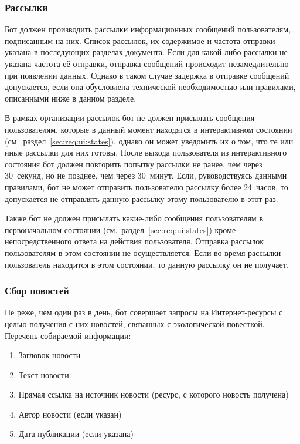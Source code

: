     \subsubsection{Рассылки}
        \label{sec:req:fn:newsletter}
        Бот должен производить рассылки информационных сообщений
        пользователям, подписанным на них. Список рассылок,
        их содержимое и частота отправки указана в последующих разделах документа.
        Если для какой-либо рассылки не указана частота её отправки, отправка сообщений происходит
        незамедлительно при появлении данных. Однако в таком случае задержка в отправке сообщений допускается,
        если она обусловлена технической необходимостью или правилами, описанными ниже в данном разделе.

        В рамках организации рассылок бот не должен присылать сообщения пользователям,
        которые в данный момент находятся в интерактивном состоянии (см.~раздел~\ref{sec:req:ui:states}),
        однако он может уведомить их о том, что те или иные рассылки для них готовы.
        После выхода пользователя из интерактивного состояния бот должен повторить попытку
        рассылки не ранее, чем через 30~секунд, но не позднее, чем через 30~минут.
        Если, руководствуясь данными правилами, бот не может отправить пользователю рассылку
        более 24~часов, то допускается не отправлять данную рассылку этому пользователю в этот раз.

        Также бот не должен присылать какие-либо сообщения пользователям в первоначальном
        состоянии (см.~раздел~\ref{sec:req:ui:states}) кроме непосредственного ответа на действия
        пользователя. Отправка рассылок пользователям в этом состоянии не осуществляется. Если
        во время рассылки пользователь находится в этом состоянии, то данную рассылку он не получает.

    \subsubsection{Сбор новостей}
        \label{sec:req:fn:grabnews}
        Не реже, чем один раз в день, бот совершает запросы на Интернет-ресурсы с целью получения с них
        новостей, связанных с экологической повесткой. Перечень собираемой информации:
        \begin{enumerate}
            \item
                Загловок новости
            \item
                Текст новости
            \item
                Прямая ссылка на источник новости (ресурс, с которого новость получена)
            \item
                Автор новости (если указан)
            \item
                Дата публикации (если указана)
        \end{enumerate}

